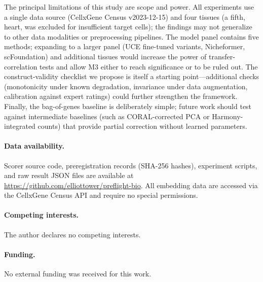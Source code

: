 \documentclass[9pt,lineno]{elife}
\begin{document}
The principal limitations of this study are scope and power. All experiments use a single data source (CellxGene Census v2023-12-15) and four tissues (a fifth, heart, was excluded for insufficient target cells); the findings may not generalize to other data modalities or preprocessing pipelines. The model panel contains five methods; expanding to a larger panel (UCE fine-tuned variants, Nicheformer, scFoundation) and additional tissues would increase the power of transfer-correlation tests and allow M3 either to reach significance or to be ruled out. The construct-validity checklist we propose is itself a starting point---additional checks (monotonicity under known degradation, invariance under data augmentation, calibration against expert ratings) could further strengthen the framework. Finally, the bag-of-genes baseline is deliberately simple; future work should test against intermediate baselines (such as CORAL-corrected PCA or Harmony-integrated counts) that provide partial correction without learned parameters.

\paragraph{Data availability.} Scorer source code, preregistration records (SHA-256 hashes), experiment scripts, and raw result JSON files are available at \url{https://github.com/elliottower/preflight-bio}. All embedding data are accessed via the CellxGene Census API and require no special permissions.

\paragraph{Competing interests.} The author declares no competing interests.

\paragraph{Funding.} No external funding was received for this work.


\end{document}
